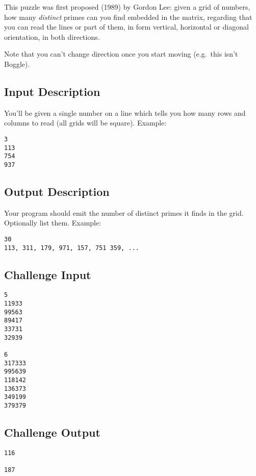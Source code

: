 This puzzle was first proposed (1989) by Gordon Lee: given a grid of
numbers, how many \emph{distinct} primes can you find embedded in the
matrix, regarding that you can read the lines or part of them, in form
vertical, horizontal or diagonal orientation, in both directions.

Note that you can't change direction once you start moving (e.g.~this
isn't Boggle).

\subsection*{Input Description}\label{input-description-25}

You'll be given a single number on a line which tells you how many rows
and columns to read (all grids will be square). Example:

\begin{lstlisting}
3 
113
754
937
\end{lstlisting}

\subsection*{Output Description}\label{output-description-27}

Your program should emit the number of distinct primes it finds in the
grid. Optionally list them. Example:

\begin{lstlisting}
30
113, 311, 179, 971, 157, 751 359, ...
\end{lstlisting}

\subsection*{Challenge Input}\label{challenge-input-30}

\begin{lstlisting}
5 
11933
99563
89417
33731
32939

6
317333
995639
118142
136373
349199
379379
\end{lstlisting}

\subsection*{Challenge Output}\label{challenge-output-25}

\begin{lstlisting}
116

187
\end{lstlisting}


